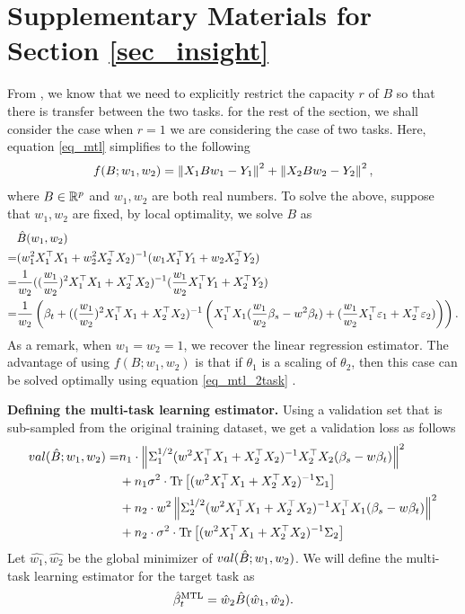 \section{Supplementary Materials for Section \ref{sec_insight}}

From \cite{WZR20}, we know that we need to explicitly restrict the capacity $r$ of $B$ so that there is transfer between the two tasks.
for the rest of the section, we shall consider the case when $r=1$ we are considering the case of two tasks.
Here, equation \eqref{eq_mtl} simplifies to the following
\begin{align}\label{eq_mtl_2task}
	f(B; w_1, w_2) = \left\| X_1 B w_1 - Y_1 \right\|^2 + \left\| X_2 B w_2 - Y_2 \right\|^2,
\end{align}
where $B\in\mathbb{R}^p$ and $w_1, w_2$ are both real numbers.
To solve the above, suppose that $w_1, w_2$ are fixed, by local optimality, we solve $B$ as
\begin{align*}
	& \hat{B}(w_1, w_2) \\
	=& (w_1^2 X_1^{\top}X_1 + w_2^2 X_2^{\top}X_2)^{-1} (w_1 X_1^{\top}Y_1 + w_2 X_2^{\top}Y_2) \\
	=& \frac{1}{w_2} ((\frac{w_1}{w_2})^2 X_1^{\top}X_1 + X_2^{\top}X_2)^{-1} (\frac{w_1}{w_2} X_1^{\top}Y_1 + X_2^{\top}Y_2) \\
	=& \frac{1}{w_2}\left({\beta_t + ((\frac{w_1}{w_2})^2 X_1^{\top}X_1 + X_2^{\top}X_2)^{-1}\left({X_1^{\top}X_1(\frac{w_1}{w_2}\beta_s - w^2\beta_t) + (\frac{w_1}{w_2} X_1^{\top}\varepsilon_1 + X_2^{\top}\varepsilon_2)}\right)}\right).
\end{align*}
As a remark, when $w_1 = w_2 = 1$, we recover the linear regression estimator.
The advantage of using $f(B; w_1, w_2)$ is that if $\theta_1$ is a scaling of $\theta_2$, then this case can be solved optimally using equation \eqref{eq_mtl_2task} \cite{KD12}.

\textbf{Defining the multi-task learning estimator.}
Using a validation set that is sub-sampled from the original training dataset, we get a validation loss as follows
\begin{align}
		val(\hat{B}; w_1, w_2)
	= & n_1 \cdot \left\| \Sigma_1^{1/2}(w^2 X_1^{\top}X_1 + X_2^{\top}X_2)^{-1}X_2^{\top}X_2(\beta_s - w\beta_t) \right\|^2 \nonumber \\
		&+ n_1 \sigma^2 \cdot \operatorname{Tr}\left[(w^2 X_1^{\top}X_1 + X_2^{\top}X_2)^{-1}\Sigma_1\right] \nonumber \\
		&+ n_2 \cdot w^2\left\| \Sigma_2^{1/2}(w^2 X_1^{\top}X_1 + X_2^{\top}X_2)^{-1}X_1^{\top}X_1(\beta_s - w\beta_t) \right\|^2 \nonumber \\
		&+ n_2 \cdot \sigma^2 \cdot \operatorname{Tr}\left[(w^2 X_1^{\top}X_1 + X_2^{\top}X_2)^{-1}\Sigma_2\right] \label{eq_val_mtl}
\end{align}
Let $\hat{w_1}, \hat{w_2}$ be the global minimizer of $val(\hat{B}; w_1, w_2)$.
We will define the multi-task learning estimator for the target task as
	\[ \hat{\beta}_t^{\text{MTL}} = \hat{w}_{2}\hat{B}(\hat{w}_1, \hat{w}_2). \]

